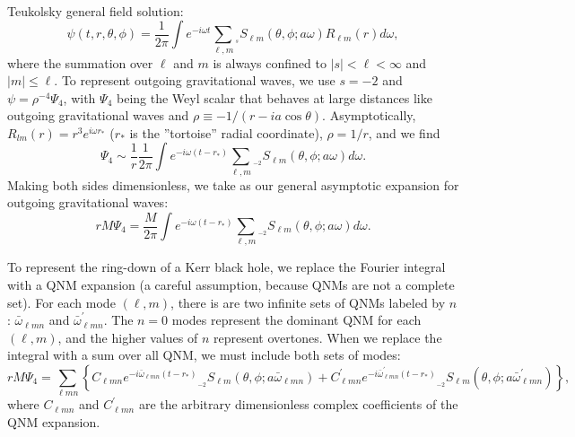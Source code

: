 \documentclass[11pt]{article}
\newcommand{\swSH}[5][]{{}_{{}_{#2}}S^{#1}_{#3}(#4;#5)}
\begin{document}
 \\

\noindent
Teukolsky general field solution:
\begin{equation}
\psi(t,r,\theta,\phi) = \frac{1}{2\pi} \int {e^{-i\omega t} \sum_{\ell,m} \swSH{s}{\ell{m}}{\theta,\phi}{a\omega}R_{\ell{m}}(r) d\omega },
\end{equation}
where the summation over $\ell$ and $m$ is always confined to $|s|<
\ell < \infty$ and $|m| \leq \ell$. To represent outgoing
gravitational waves, we use $s=-2$ and $\psi = \rho^{-4}\Psi_4$, with
$\Psi_4$ being the Weyl scalar that behaves at large distances like
outgoing gravitational waves and $\rho\equiv-1/(r-ia\cos\theta)$.
Asymptotically, $R_{lm}(r)=r^3e^{i\omega r_*}$ ($r_*$ is the
''tortoise'' radial coordinate), $\rho=1/r$, and we find
\begin{equation}
\Psi_4 \sim \frac1{r}\frac{1}{2\pi} \int {e^{-i\omega (t-r_*)} \sum_{\ell,m} \swSH{\minus 2}{\ell{m}}{\theta,\phi}{a\omega} d\omega }.
\end{equation}
Making both sides dimensionless, we take as our general asymptotic expansion for outgoing gravitational waves:
\begin{equation}
rM\Psi_4 = \frac{M}{2\pi} \int {e^{-i\omega (t-r_*)} \sum_{\ell,m} \swSH{\minus 2}{\ell{m}}{\theta,\phi}{a\omega} d\omega }.
\end{equation}

To represent the ring-down of a Kerr black hole, we replace the
Fourier integral with a QNM expansion (a careful assumption, because
QNMs are not a complete set).  For each mode $(\ell,m)$, there is are
two infinite sets of QNMs labeled by $n$: $\bar\omega_{\ell{m}n}$ and
$\bar\omega^\prime_{\ell{m}n}$.  The $n=0$ modes represent the
dominant QNM for each $(\ell,m)$, and the higher values of $n$
represent overtones.  When we replace the integral with a sum over all QNM, we must include both sets of modes:
\begin{equation}
rM\Psi_4 = \sum_{\ell{m}n}\left\{C_{\ell{m}n}e^{-i\bar\omega_{\ell{m}n} (t-r_*)}
           \swSH{\minus 2}{\ell{m}}{\theta,\phi}{a\bar\omega_{\ell{m}n}} 
           + C^\prime_{\ell{m}n}e^{-i\bar\omega^\prime_{\ell{m}n} (t-r_*)}
           \swSH{\minus 2}{\ell{m}}{\theta,\phi}{a\bar\omega^\prime_{\ell{m}n}}
           \right\}, 
\end{equation}
where $C_{\ell{m}n}$ and $C^\prime_{\ell{m}n}$ are the arbitrary
dimensionless complex coefficients of the QNM expansion.
\end{document}
